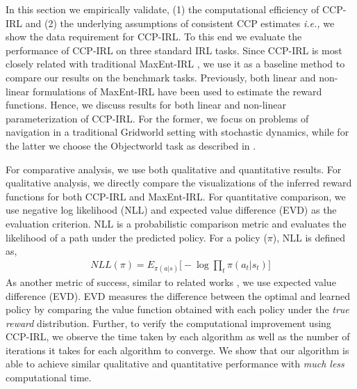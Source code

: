 \documentclass{article}
\begin{document}
In this section we empirically validate,
(1) the computational efficiency of CCP-IRL and (2) the underlying assumptions of consistent CCP estimates \emph{i.e.,} we show the data requirement for CCP-IRL.
To this end we evaluate the performance of CCP-IRL on three standard IRL tasks. Since CCP-IRL is most closely related with traditional MaxEnt-IRL \cite{ziebart}, we use it as a baseline method to compare our results on the benchmark tasks. Previously, both linear \cite{ziebart} \cite{ziebart2010modeling} and non-linear \cite{wulfmeier2015maximum} formulations of MaxEnt-IRL have been used to estimate the reward functions. Hence, we discuss results for both linear and non-linear parameterization of CCP-IRL. For the former, we focus on problems of navigation in a traditional Gridworld setting with stochastic dynamics, while for the latter we choose the Objectworld task as described in \cite{Levine2013}.

For comparative analysis, we use both qualitative and quantitative results.
For qualitative analysis, we directly compare the visualizations of the inferred reward functions for both CCP-IRL and MaxEnt-IRL.
For quantitative comparison, we use negative log likelihood (NLL) \cite{kitani2012activity} and expected value difference (EVD) \cite{levine2011nonlinear} as the evaluation criterion. NLL is a probabilistic comparison metric and evaluates the likelihood of a path under the predicted policy. For a policy ($\pi$), NLL is defined as,
\begin{align}
NLL(\pi) = E_{\pi(a|s)}\big[-\log \prod_{t} \pi(a_{t}|s_{t}) \big]
\end{align}
As another metric of success, similar to related works \cite{Levine2013} \cite{wulfmeier2015maximum}, we use expected value difference (EVD). EVD measures the difference between the optimal and learned policy by comparing the value function obtained with each policy under the \textit{true reward} distribution.
Further, to verify the computational improvement using CCP-IRL, we observe the time taken by each algorithm as well as the number of iterations it takes for each algorithm to converge. We show that our algorithm is able to achieve similar qualitative and quantitative performance with \textit{much less} computational time.
\end{document}
